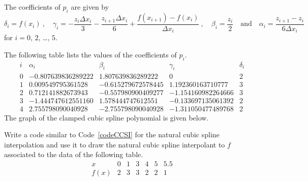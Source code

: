 {The coefficients of $p_i$ are given by
\[
\delta_i = f(x_i)  \ , \quad
\gamma_i = -\frac{z_i \Delta x_i}{3} - \frac{z_{i+1} \Delta x_i}{6} +
\frac{f(x_{i+1})-f(x_i)}{\Delta x_i}  \ , \quad
\beta_i = \frac{z_i}{2} \quad \text{and} \quad
\alpha_i = \frac{z_{i+1}-z_i}{6 \Delta x_i}
\]
for $i=0$, $2$, \ldots, $5$.

The following table lists the values of the coefficients of
$p_i$.
\[
\begin{array}{c|cccc}
i & \alpha_i & \beta_i & \gamma_i & \delta_i \\
\hline
0 & -0.807639836289222 & 1.807639836289222 & 0 & 2 \\
1 & 0.009549795361528 & -0.615279672578445 & 1.192360163710777 & 3 \\
2 & 0.712141882673943 & -0.557980900409277 & -1.154160982264666 & 3 \\
3 & -1.444747612551160 & 1.578444747612551 & -0.133697135061392 & 2 \\
4 & 2.755798090040928 & -2.755798090040928 & -1.311050477489768 & 2
\end{array}
\]
The graph of the clamped cubic spline polynomial is given below.
}

\begin{question}
Write a code similar to Code~\ref{codeCCSI} for the natural cubic spline
interpolation and use it to draw the natural cubic spline interpolant
to $f$ associated to the data of the following table.
\[
\begin{array}{c|cccccc}
x & 0 & 1 & 3 & 4 & 5 & 5.5 \\
\hline
f(x) & 2 & 3 & 3 & 2 & 2 & 1
\end{array}
\]
\label{intBQ2}
\end{question}

  
